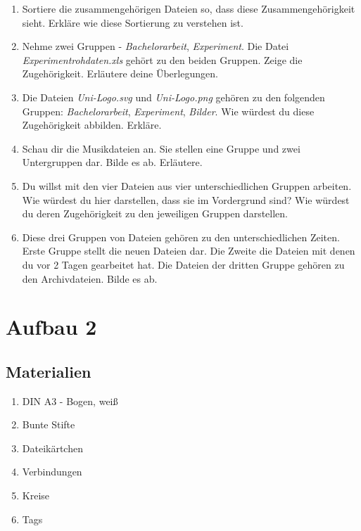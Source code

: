 \begin{enumerate}
\item Sortiere die zusammengehörigen Dateien so, dass diese Zusammengehörigkeit sieht. Erkläre wie diese Sortierung zu verstehen ist.

\item Nehme zwei Gruppen - \emph{Bachelorarbeit}, \emph{Experiment}. Die Datei \emph{Experimentrohdaten.xls} gehört zu den beiden Gruppen. Zeige die Zugehörigkeit. Erläutere deine Überlegungen.

\item Die Dateien \emph{Uni-Logo.svg} und \emph{Uni-Logo.png} gehören zu den folgenden Gruppen: \emph{Bachelorarbeit}, \emph{Experiment}, \emph{Bilder}. Wie würdest du diese Zugehörigkeit abbilden. Erkläre.

\item Schau dir die Musikdateien an. Sie stellen eine Gruppe und zwei Untergruppen dar. Bilde es ab. Erläutere.

\item Du willst mit den vier Dateien aus vier unterschiedlichen Gruppen arbeiten. Wie würdest du hier darstellen, dass sie im Vordergrund sind? Wie würdest du deren Zugehörigkeit zu den jeweiligen Gruppen darstellen.

\item Diese drei Gruppen von Dateien gehören zu den unterschiedlichen Zeiten. Erste Gruppe stellt die neuen Dateien dar. Die Zweite die Dateien mit denen du vor 2 Tagen gearbeitet hat. Die Dateien der dritten Gruppe gehören zu den Archivdateien. Bilde es ab.

\end{enumerate}

\pagebreak

\section{Aufbau 2}
\label{aufbau2}

\subsection{Materialien}
\label{materialien}

\begin{enumerate}
\item DIN A3 - Bogen, weiß

\item Bunte Stifte

\item Dateikärtchen

\item Verbindungen

\item Kreise

\item Tags

\end{enumerate}

